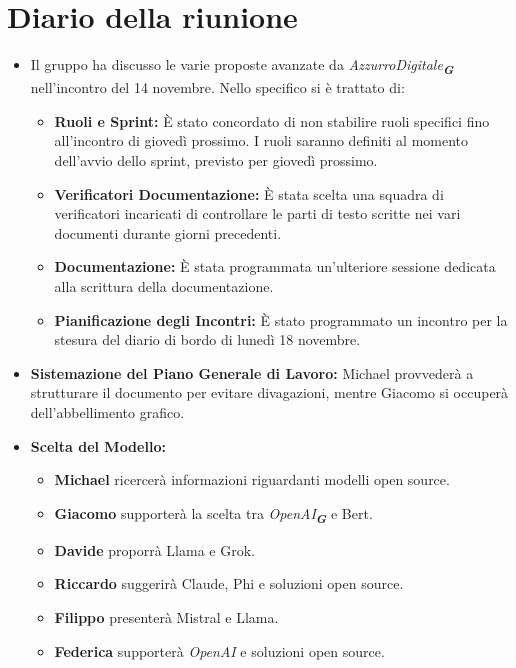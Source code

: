 
\section{Diario della riunione}

\begin{itemize}
    \item Il gruppo ha discusso le varie proposte avanzate da \emph{AzzurroDigitale}\textsubscript{\textit{\textbf{G}}} nell'incontro del 14 novembre. Nello specifico si è trattato di:
    \begin{itemize}
        \renewcommand{\labelitemii}{--}
        \item \textbf{Ruoli e Sprint:} È stato concordato di non stabilire ruoli specifici fino all'incontro di giovedì prossimo. I ruoli saranno definiti al momento dell'avvio dello sprint, previsto per giovedì prossimo.
        \item \textbf{Verificatori Documentazione:} È stata scelta una squadra di verificatori incaricati di controllare le parti di testo scritte nei vari documenti durante giorni precedenti.
        \item \textbf{Documentazione:} È stata programmata un'ulteriore sessione dedicata alla scrittura della documentazione.
        \item \textbf{Pianificazione degli Incontri:} È stato programmato un incontro per la stesura del diario di bordo di lunedì 18 novembre.
    \end{itemize}
    
    \item \textbf{Sistemazione del Piano Generale di Lavoro:} Michael provvederà a strutturare il documento per evitare divagazioni, mentre Giacomo si occuperà dell'abbellimento grafico.
    
    \item \textbf{Scelta del Modello:}
    \begin{itemize}
        \renewcommand{\labelitemii}{--}
        \item \textbf{Michael} ricercerà informazioni riguardanti modelli open source.
        \item \textbf{Giacomo} supporterà la scelta tra \emph{OpenAI}\textsubscript{\textit{\textbf{G}}} e Bert.
        \item \textbf{Davide} proporrà Llama e Grok.
        \item \textbf{Riccardo} suggerirà Claude, Phi e soluzioni open source.
        \item \textbf{Filippo} presenterà Mistral e Llama.
        \item \textbf{Federica} supporterà \emph{OpenAI} e soluzioni open source.
    \end{itemize}
    

\end{itemize}
